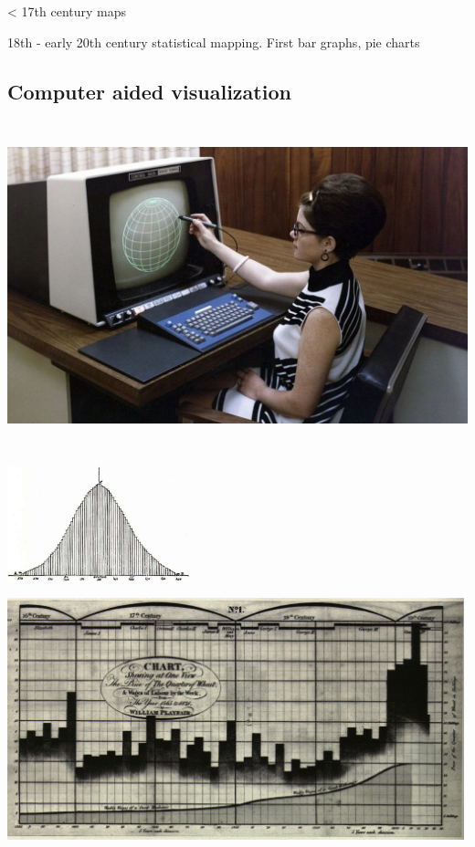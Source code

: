 \documentclass[
  letterpaper,
  DIV=11,
  numbers=noendperiod]{scrartcl}
\begin{document}
\textless{} 17th century maps

18th - early 20th century statistical mapping. First bar graphs, pie
charts

\hypertarget{computer-aided-visualization}{%
\subsection{Computer aided
visualization}\label{computer-aided-visualization}}

\includegraphics[width=\textwidth,height=3.75in]{images/1970s_computer_graphics.png}

\includegraphics[width=2.08333in,height=\textheight]{images/binomial-quetelet-1846.jpg}

\includegraphics[width=5.20833in,height=\textheight]{images/Playfair_1821.png}
\end{document}
